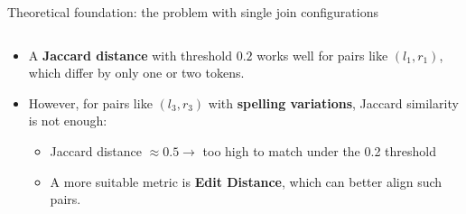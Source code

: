 \documentclass[8pt]{beamer} %
\begin{document}
\begin{frame}{Theoretical foundation: the problem with single join configurations}
\begin{columns}
\begin{column}{0.45\textwidth}
			
			\vspace{0.5em}
			\small
			\begin{itemize}
				\item A \textbf{Jaccard distance} with threshold $0.2$ works well for pairs like $(l_1, r_1)$, which differ by only one or two tokens.
				\item However, for pairs like $(l_3, r_3)$ with \textbf{spelling variations}, Jaccard similarity is not enough:
				\begin{itemize}
					\item Jaccard distance $\approx 0.5 \rightarrow$ too high to match under the 0.2 threshold
					\item A more suitable metric is \textbf{Edit Distance}, which can better align such pairs.
				\end{itemize}
			\end{itemize}
		\end{column}

	\end{columns}
	
\end{frame}
\end{document}
